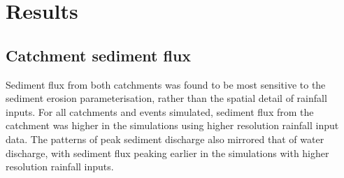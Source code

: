 %
%

\section{Results}
\subsection{Catchment sediment flux}
Sediment flux from both catchments was found to be most sensitive to the sediment erosion parameterisation, rather than the spatial detail of rainfall inputs. For all catchments and events simulated, sediment flux from the catchment was higher in the simulations using higher resolution rainfall input data. The patterns of peak sediment discharge also mirrored that of water discharge, with sediment flux peaking earlier in the simulations with higher resolution rainfall inputs. 


